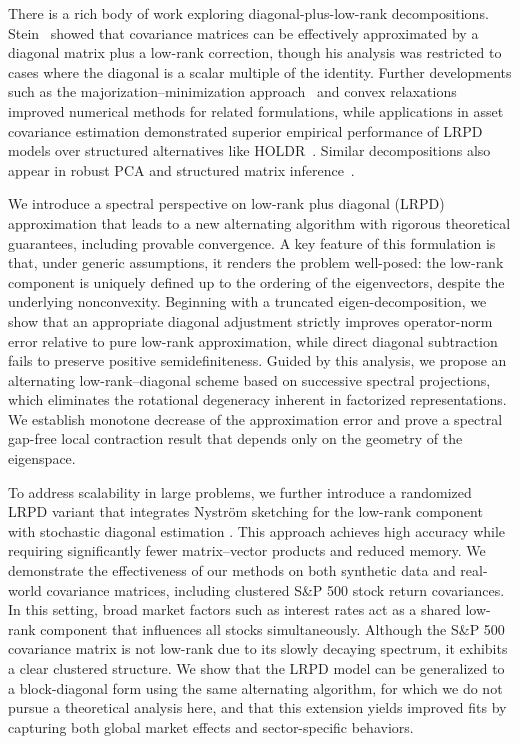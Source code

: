\documentclass[final,hidelinks,onefignum,onetabnum]{siamart250211}
\providecommand{\1}{\mathbf{1}}
\theoremstyle{plain}
\begin{document}
There is a rich body of work exploring diagonal-plus-low-rank decompositions. Stein~\cite{stein2014limitations} showed that covariance matrices can be effectively approximated by a diagonal matrix plus a low-rank correction, though his analysis was restricted to cases where the diagonal is a scalar multiple of the identity. Further developments such as the majorization–minimization approach~\cite{sun2016majorization} and convex relaxations~\cite{zhou2022covariance} improved numerical methods for related formulations, while applications in asset covariance estimation demonstrated superior empirical performance of LRPD models over structured alternatives like HOLDR~\cite{parshakova2024factor}. Similar decompositions also appear in robust PCA and structured matrix inference~\cite{bonnabel2024low, saunderson2012diagonal, zhao2016low}.  


We introduce a spectral perspective on low-rank plus diagonal (LRPD) approximation that leads to a new alternating algorithm with rigorous theoretical guarantees, including provable convergence. A key feature of this formulation is that, under generic assumptions, it renders the problem well-posed: the low-rank component is uniquely defined up to the ordering of the eigenvectors, despite the underlying nonconvexity. Beginning with a truncated eigen-decomposition, we show that an appropriate diagonal adjustment strictly improves operator-norm error relative to pure low-rank approximation, while direct diagonal subtraction fails to preserve positive semidefiniteness. Guided by this analysis, we propose an alternating low-rank–diagonal scheme based on successive spectral projections, which eliminates the rotational degeneracy inherent in factorized representations. We establish monotone decrease of the approximation error and prove a spectral gap-free local contraction result that depends only on the geometry of the eigenspace.

 
To address scalability in large problems, we further introduce a randomized LRPD variant that integrates Nyström sketching \cite{frangella2023randomized} for the low-rank component with stochastic diagonal estimation \cite{baston2022stochastic}. This approach achieves high accuracy while requiring significantly fewer matrix--vector products and reduced memory. We demonstrate the effectiveness of our methods on both synthetic data and real-world covariance matrices, including clustered S\&P 500 stock return covariances. In this setting, broad market factors such as interest rates act as a shared low-rank component that influences all stocks simultaneously. Although the S\&P 500 covariance matrix is not low-rank due to its slowly decaying spectrum, it exhibits a clear clustered structure. We show that the LRPD model can be generalized to a block-diagonal form using the same alternating algorithm, for which we do not pursue a theoretical analysis here, and that this extension yields improved fits by capturing both global market effects and sector-specific behaviors.
\end{document}
